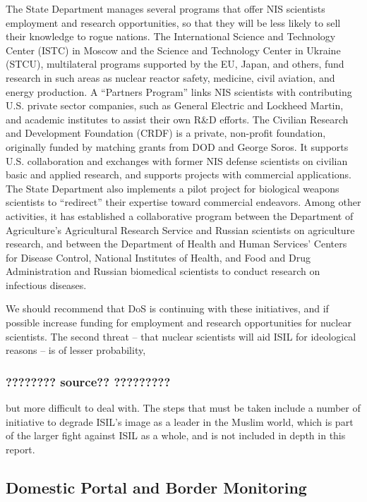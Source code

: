 \documentclass{report}
\begin{document}
{The State Department manages several programs that offer NIS scientists employment and research opportunities, so that they will be less likely to sell their knowledge to rogue nations. The International Science and Technology Center (ISTC) in Moscow and the Science and Technology Center in Ukraine (STCU), multilateral programs supported by the EU, Japan, and others, fund research in such areas as nuclear reactor safety, medicine, civil aviation, and energy production. A \enquote{Partners Program} links NIS scientists with contributing U.S. private sector companies, such as General Electric and Lockheed Martin, and academic institutes to assist their own R\&D efforts. The Civilian Research and Development Foundation (CRDF) is a private, non-profit foundation, originally funded by matching grants from DOD and George Soros. It supports U.S. collaboration and exchanges with former NIS defense scientists on civilian basic and applied research, and supports projects with commercial applications. The State Department also implements a pilot project for biological weapons scientists to \enquote{redirect} their expertise toward commercial endeavors. Among other activities, it has established a collaborative program between the Department of Agriculture's Agricultural Research Service and Russian scientists on agriculture research, and between the Department of Health and Human Services' Centers for Disease Control, National Institutes of Health, and Food and Drug Administration and Russian biomedical scientists to conduct research on infectious diseases. }

We should recommend that DoS is continuing with these initiatives, and if possible increase funding for employment and research opportunities for nuclear scientists. The second threat – that nuclear scientists will aid ISIL for ideological reasons – is of lesser probability, \subsubsection{???????? source?? ?????????} but more difficult to deal with. The steps that must be taken include a number of initiative to degrade ISIL's image as a leader in the Muslim world, which is part of the larger fight against ISIL as a whole, and is not included in depth in this report. 

\subsection{Domestic Portal and Border Monitoring}
\end{document}
